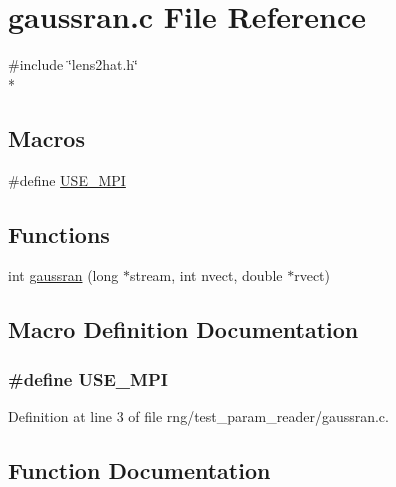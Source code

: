 \section{gaussran.\-c File Reference}
\label{rng_2test__param__reader_2gaussran_8c}
{\ttfamily \#include \char`\"{}lens2hat.\-h\char`\"{}}\\*
\subsection*{Macros}
\begin{DoxyCompactItemize}
\item 
\#define \hyperlink{rng_2test__param__reader_2gaussran_8c_a3869d282031f6ea6b50fdb980b758420}{U\-S\-E\-\_\-\-M\-P\-I}
\end{DoxyCompactItemize}
\subsection*{Functions}
\begin{DoxyCompactItemize}
\item 
int \hyperlink{rng_2test__param__reader_2gaussran_8c_a39a2ff3b20f7a76c857538b7a20fe7bf}{gaussran} (long $\ast$stream, int nvect, double $\ast$rvect)
\end{DoxyCompactItemize}


\subsection{Macro Definition Documentation}
\subsubsection[{U\-S\-E\-\_\-\-M\-P\-I}]{\setlength{\rightskip}{0pt plus 5cm}\#define U\-S\-E\-\_\-\-M\-P\-I}\label{rng_2test__param__reader_2gaussran_8c_a3869d282031f6ea6b50fdb980b758420}


Definition at line 3 of file rng/test\-\_\-param\-\_\-reader/gaussran.\-c.



\subsection{Function Documentation}
